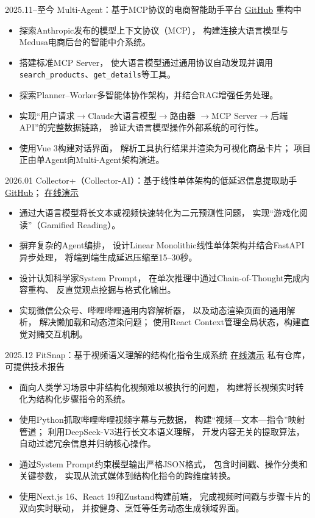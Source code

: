 \documentclass[10pt,a4paper,sans]{moderncv}
\begin{document}
\cventry
  {2025.11--至今}
  {Multi-Agent：基于MCP协议的电商智能助手平台}
  {\href{https://github.com/YifeiWang0618/Multi-Agent}{GitHub}}
  {}
  {重构中}
  {
    \begin{itemize}
      \item 探索Anthropic发布的模型上下文协议（MCP），
      构建连接大语言模型与Medusa电商后台的智能中介系统。
      \item 搭建标准MCP Server，
      使大语言模型通过通用协议自动发现并调用
      \texttt{search\_products}、\texttt{get\_details}等工具。
      \item 探索Planner--Worker多智能体协作架构，并结合RAG增强任务处理。
      \item 实现“用户请求$\rightarrow$Claude大语言模型$\rightarrow$路由器
      $\rightarrow$MCP Server$\rightarrow$后端API”的完整数据链路，
      验证大语言模型操作外部系统的可行性。
      \item 使用Vue 3构建对话界面，
      解析工具执行结果并渲染为可视化商品卡片；
      项目正由单Agent向Multi-Agent架构演进。
    \end{itemize}
  }

\cventry
  {2026.01}
  {Collector+（Collector-AI）：基于线性单体架构的低延迟信息提取助手}
  {\href{https://github.com/YifeiWang0618/Creator_ai}{GitHub}；
  \href{https://collectorai.top/}{在线演示}}
  {}
  {}
  {
    \begin{itemize}
      \item 通过大语言模型将长文本或视频快速转化为二元预测性问题，
      实现“游戏化阅读”（Gamified Reading）。
      \item 摒弃复杂的Agent编排，
      设计Linear Monolithic线性单体架构并结合FastAPI异步处理，
      将端到端生成延迟压缩至15--30秒。
      \item 设计认知科学家System Prompt，
      在单次推理中通过Chain-of-Thought完成内容重构、
      反直觉观点挖掘与格式化输出。
      \item 实现微信公众号、哔哩哔哩通用内容解析器，
      以及动态渲染页面的通用解析，
      解决懒加载和动态渲染问题；
      使用React Context管理全局状态，构建直觉对赌交互机制。
    \end{itemize}
  }

\cventry
  {2025.12}
  {FitSnap：基于视频语义理解的结构化指令生成系统}
  {\href{https://fit-snap-beige.vercel.app/}{在线演示}}
  {}
  {私有仓库，可提供技术报告}
  {
    \begin{itemize}
      \item 面向人类学习场景中非结构化视频难以被执行的问题，
      构建将长视频实时转化为结构化步骤指令的系统。
      \item 使用Python抓取哔哩哔哩视频字幕与元数据，
      构建“视频—文本—指令”映射管道；
      利用DeepSeek-V3进行长文本语义理解，
      开发内容无关的提取算法，自动过滤冗余信息并归纳核心操作。
      \item 通过System Prompt约束模型输出严格JSON格式，
      包含时间戳、操作分类和关键参数，
      实现从流式媒体到结构化指令的跨维度转换。
      \item 使用Next.js 16、React 19和Zustand构建前端，
      完成视频时间戳与步骤卡片的双向实时联动，
      并按健身、烹饪等任务动态生成领域界面。
    \end{itemize}
  }
\end{document}

